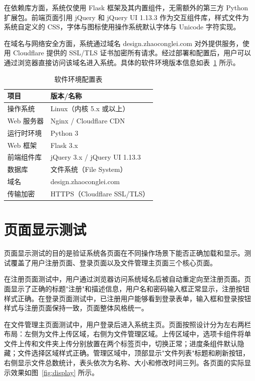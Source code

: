 \documentclass[UTF8,zihao=-4]{ctexrep}
\begin{document}
在依赖库方面，系统仅使用 Flask 框架及其内置组件，无需额外的第三方 Python 扩展包。前端页面引用 jQuery 和 jQuery UI 1.13.3 作为交互组件库，样式文件为系统自定义的 CSS，字体与图标使用操作系统默认字体与 Unicode 字符实现。

在域名与网络安全方面，系统通过域名 design.zhaoconglei.com 对外提供服务，使用 Cloudflare 提供的 SSL/TLS 证书加密所有请求。经过部署和配置后，用户可以通过浏览器直接访问该域名进入系统。具体的软件环境版本信息如表~\ref{tab:software} 所示。

\begin{table}[H]
    \centering
    \caption{软件环境配置表}\label{tab:software}
    \begin{tabular}{|l|l|}
        \hline
        \textbf{项目} & \textbf{版本/名称} \\
        \hline
        操作系统 & Linux（内核 5.x 或以上） \\
        \hline
        Web 服务器 & Nginx / Cloudflare CDN \\
        \hline
        运行时环境 & Python 3 \\
        \hline
        Web 框架 & Flask 3.x \\
        \hline
        前端组件库 & jQuery 3.x / jQuery UI 1.13.3 \\
        \hline
        数据库 & 文件系统（File System） \\
        \hline
        域名 & design.zhaoconglei.com \\
        \hline
        传输加密 & HTTPS（Cloudflare SSL/TLS） \\
        \hline
    \end{tabular}
\end{table}

\section{页面显示测试}

页面显示测试的目的是验证系统各页面在不同操作场景下能否正确加载和显示。测试覆盖了用户注册页面、登录页面以及文件管理主页面三个核心页面。

在注册页面测试中，用户通过浏览器访问系统域名后被自动重定向至注册页面。页面显示了正确的标题"注册"和描述信息，用户名和密码输入框正常显示，注册按钮样式正确。在登录页面测试中，已注册用户能够看到登录表单，输入框和登录按钮样式与注册页面保持一致，页面整体风格统一。

在文件管理主页面测试中，用户登录后进入系统主页。页面按照设计分为左右两栏布局：左侧为文件上传区域，右侧为文件管理区域。上传区域中，选项卡组件将单文件上传和文件夹上传分别放置在两个标签页中，切换正常；进度条组件默认隐藏；文件选择区域样式正确。管理区域中，顶部显示"文件列表"标题和刷新按钮，右侧显示文件总数统计，表头依次为名称、大小和修改时间三列。各页面的实际显示效果如图~\ref{fig:display} 所示。
\end{document}
